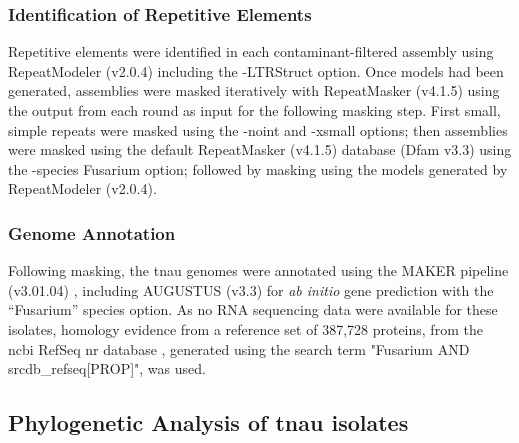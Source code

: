 \subsubsection{Identification of Repetitive Elements}

Repetitive elements were identified in each contaminant-filtered assembly using RepeatModeler (v2.0.4) \parencite{Flynn2020} including the -LTRStruct option. Once models had been generated, assemblies were masked iteratively with RepeatMasker (v4.1.5) \parencite{Smit2010} using the output from each round as input for the following masking step. First small, simple repeats were masked using the -noint and -xsmall options; then assemblies were masked using the default RepeatMasker (v4.1.5)  database (Dfam v3.3) \parencite{Storer2021} using the -species Fusarium option; followed by masking using the models generated by RepeatModeler (v2.0.4).

\subsubsection{Genome Annotation}
Following masking, the \ac{tnau} genomes were annotated using the MAKER pipeline (v3.01.04) \parencite{Holt2011}, including AUGUSTUS (v3.3) \parencite{Stanke2006} for \textit{ab initio} gene prediction with the “Fusarium” species option. As no RNA sequencing data were available for these isolates, homology evidence from a reference set of 387,728 proteins, from the \ac{ncbi} RefSeq nr database \parencite{Agarwala2016}, generated using the search term "Fusarium AND srcdb\_refseq[PROP]", was used. 

\subsection{Phylogenetic Analysis of \ac{tnau} isolates}\label{chap2:phylogeny}

